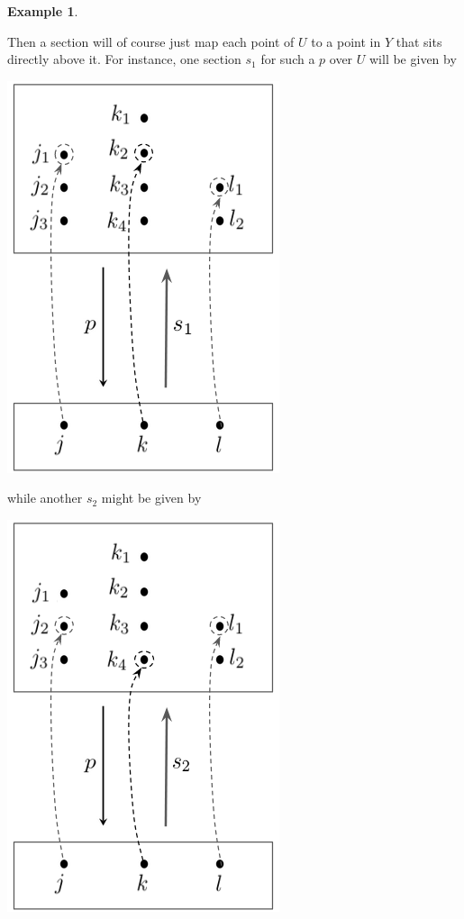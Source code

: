 \documentclass[11pt]{book}
\theoremstyle{definition}
\newtheorem{example}{Example}[section]
\theoremstyle{definition}
\theoremstyle{definition}
\theoremstyle{theorem}
\theoremstyle{definition}
\begin{document}
\begin{example}
\begin{center}
\end{center}
Then a section will of course just map each point of $U$ to a point in $Y$ that sits directly above it. For instance, one section $s_1$ for such a $p$ over $U$ will be given by 
\begin{center}
	\includegraphics*[scale=0.25]{SectionOne.png}
\end{center}
while another $s_2$ might be given by 
\begin{center}
	\includegraphics*[scale=0.25]{SectionTwo.png}

\end{center}
\end{example}
\end{document}
